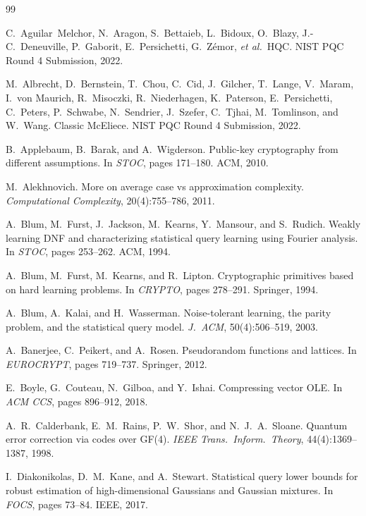 \documentclass[11pt,a4paper]{article}
\theoremstyle{plain}
\theoremstyle{definition}
\newcommand{\etal}{\textit{et al.}}
\begin{document}
\begin{thebibliography}{99}

C.~Aguilar~Melchor, N.~Aragon, S.~Bettaieb, L.~Bidoux, O.~Blazy, J.-C.~Deneuville, P.~Gaborit, E.~Persichetti, G.~Z\'emor, \etal\
HQC.
NIST PQC Round 4 Submission, 2022.

M.~Albrecht, D.~Bernstein, T.~Chou, C.~Cid, J.~Gilcher, T.~Lange, V.~Maram, I.~von Maurich, R.~Misoczki, R.~Niederhagen, K.~Paterson, E.~Persichetti, C.~Peters, P.~Schwabe, N.~Sendrier, J.~Szefer, C.~Tjhai, M.~Tomlinson, and W.~Wang.
Classic McEliece.
NIST PQC Round 4 Submission, 2022.

B.~Applebaum, B.~Barak, and A.~Wigderson.
Public-key cryptography from different assumptions.
In \emph{STOC}, pages 171--180. ACM, 2010.

M.~Alekhnovich.
More on average case vs approximation complexity.
\emph{Computational Complexity}, 20(4):755--786, 2011.

A.~Blum, M.~Furst, J.~Jackson, M.~Kearns, Y.~Mansour, and S.~Rudich.
Weakly learning DNF and characterizing statistical query learning using Fourier analysis.
In \emph{STOC}, pages 253--262. ACM, 1994.

A.~Blum, M.~Furst, M.~Kearns, and R.~Lipton.
Cryptographic primitives based on hard learning problems.
In \emph{CRYPTO}, pages 278--291. Springer, 1994.

A.~Blum, A.~Kalai, and H.~Wasserman.
Noise-tolerant learning, the parity problem, and the statistical query model.
\emph{J.\ ACM}, 50(4):506--519, 2003.

A.~Banerjee, C.~Peikert, and A.~Rosen.
Pseudorandom functions and lattices.
In \emph{EUROCRYPT}, pages 719--737. Springer, 2012.

E.~Boyle, G.~Couteau, N.~Gilboa, and Y.~Ishai.
Compressing vector OLE.
In \emph{ACM CCS}, pages 896--912, 2018.

A.~R.~Calderbank, E.~M.~Rains, P.~W.~Shor, and N.~J.~A.~Sloane.
Quantum error correction via codes over GF(4).
\emph{IEEE Trans.\ Inform.\ Theory}, 44(4):1369--1387, 1998.

I.~Diakonikolas, D.~M.~Kane, and A.~Stewart.
Statistical query lower bounds for robust estimation of high-dimensional Gaussians and Gaussian mixtures.
In \emph{FOCS}, pages 73--84. IEEE, 2017.


\end{thebibliography}
\end{document}
